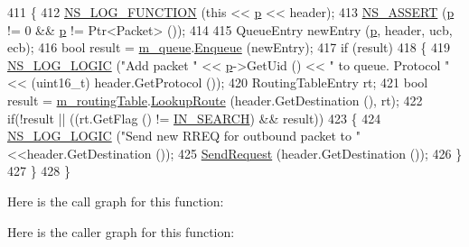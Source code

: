 \begin{DoxyCode}
411 \{
412   \hyperlink{log-macros-disabled_8h_a90b90d5bad1f39cb1b64923ea94c0761}{NS\_LOG\_FUNCTION} (\textcolor{keyword}{this} << \hyperlink{lte__link__budget_8m_ac9de518908a968428863f829398a4e62}{p} << header);
413   \hyperlink{assert_8h_a6dccdb0de9b252f60088ce281c49d052}{NS\_ASSERT} (\hyperlink{lte__link__budget_8m_ac9de518908a968428863f829398a4e62}{p} != 0 && \hyperlink{lte__link__budget_8m_ac9de518908a968428863f829398a4e62}{p} != Ptr<Packet> ());
414 
415   QueueEntry newEntry (\hyperlink{lte__link__budget_8m_ac9de518908a968428863f829398a4e62}{p}, header, ucb, ecb);
416   \textcolor{keywordtype}{bool} result = \hyperlink{classns3_1_1aodv_1_1RoutingProtocol_afd2e6004e54cac8abd2d95cec3ee9580}{m\_queue}.\hyperlink{classns3_1_1aodv_1_1RequestQueue_ac48ac1f8e19e35f239176e1f3ff038ec}{Enqueue} (newEntry);
417   \textcolor{keywordflow}{if} (result)
418     \{
419       \hyperlink{group__logging_ga88acd260151caf2db9c0fc84997f45ce}{NS\_LOG\_LOGIC} (\textcolor{stringliteral}{"Add packet "} << \hyperlink{lte__link__budget_8m_ac9de518908a968428863f829398a4e62}{p}->GetUid () << \textcolor{stringliteral}{" to queue. Protocol "} << (uint16\_t) 
      header.GetProtocol ());
420       RoutingTableEntry rt;
421       \textcolor{keywordtype}{bool} result = \hyperlink{classns3_1_1aodv_1_1RoutingProtocol_a4e1003a34c8adc96db71096d88c98ae0}{m\_routingTable}.\hyperlink{classns3_1_1aodv_1_1RoutingTable_a90cbc8a2c65cd68ccdaf768fcbb5d723}{LookupRoute} (header.GetDestination (), rt);
422       \textcolor{keywordflow}{if}(!result || ((rt.GetFlag () != \hyperlink{group__aodv_gga44216921a9c725a5ab8bc19059052a26aba44cda5a5df371b6567f70d7d8311fa}{IN\_SEARCH}) && result))
423         \{
424           \hyperlink{group__logging_ga88acd260151caf2db9c0fc84997f45ce}{NS\_LOG\_LOGIC} (\textcolor{stringliteral}{"Send new RREQ for outbound packet to "} <<header.GetDestination ());
425           \hyperlink{classns3_1_1aodv_1_1RoutingProtocol_a483f8df4d7855b2a71e506f665ca0828}{SendRequest} (header.GetDestination ());
426         \}
427     \}
428 \}
\end{DoxyCode}


Here is the call graph for this function\+:




Here is the caller graph for this function\+:


